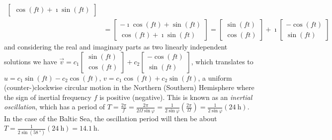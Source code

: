 \begin{solution}
\begin{align*}
\begin{bmatrix}
\cos(ft) + \imath \sin(ft)
\end{bmatrix} \\
&= \begin{bmatrix}
-\imath \cos(ft) + \sin(ft) \\
\cos(ft) + \imath \sin(ft)
\end{bmatrix} = 
\begin{bmatrix}
\sin(ft) \\
\cos(ft) 
\end{bmatrix}
+\imath 
\begin{bmatrix}
-\cos(ft) \\
\sin(ft) 
\end{bmatrix}
\end{align*}
and considering the real and imaginary parts as two linearly independent solutions we have $\vec{v} = c_1\begin{bmatrix}
\sin(ft) \\
\cos(ft) 
\end{bmatrix} + c_2\begin{bmatrix}
-\cos(ft) \\
\sin(ft) 
\end{bmatrix}$, which translates to $u = c_1\sin(ft) - c_2\cos(ft)$, $v = c_1\cos(ft) + c_2\sin(ft)$, a uniform (counter-)clockwise circular motion in the Northern (Southern) Hemisphere where the sign of inertial frequency $f$ is positive (negative). This is known as an \textit{inertial oscillation}, which has a period of $T = \frac{2\pi}{f} = \frac{2\pi}{2\Omega \sin \varphi} = \frac{1}{2 \sin \varphi}(\frac{2\pi}{\Omega}) = \frac{1}{2 \sin \varphi}(\SI{24}{\hour})$. In the case of the Baltic Sea, the oscillation period will then be about $T = \frac{1}{2 \sin(\SI{58}{\degree})}(\SI{24}{\hour}) = \SI{14.1}{\hour}$.
\end{solution}

